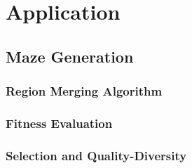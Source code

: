 \chapter{Application}

\section{Maze Generation}

\subsection{Region Merging Algorithm}

\subsection{Fitness Evaluation}

\subsection{Selection and Quality-Diversity}

